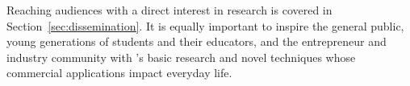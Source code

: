 






Reaching audiences with a direct interest in \acronym research is covered in Section~\ref{sec:dissemination}. 
It is equally important to inspire the general public, young generations of students and their educators, and the entrepreneur and industry community with \acronym's basic research and novel techniques whose commercial applications impact everyday life. 

